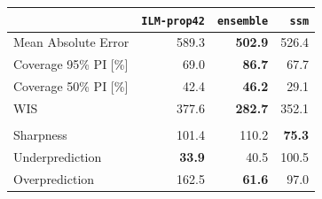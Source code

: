 
\begin{tabular}[t]{l>{}r>{}r>{}r}
\toprule
 & \texttt{ILM-prop42} & \texttt{ensemble} & \texttt{ssm}\\
\midrule
Mean Absolute Error & 589.3 & \textbf{502.9} & 526.4\\
Coverage 95\% PI [\%] & 69.0 & \textbf{86.7} & 67.7\\
Coverage 50\% PI [\%] & 42.4 & \textbf{46.2} & 29.1\\
WIS & 377.6 & \textbf{282.7} & 352.1\\
\addlinespace[0.3em]
\multicolumn{4}{l}{\textbf{WIS components}}\\
\hspace{1em}Sharpness & 101.4 & 110.2 & \textbf{75.3}\\
\hspace{1em}Underprediction & \textbf{33.9} & 40.5 & 100.5\\
\hspace{1em}Overprediction & 162.5 & \textbf{61.6} & 97.0\\
\bottomrule
\end{tabular}
